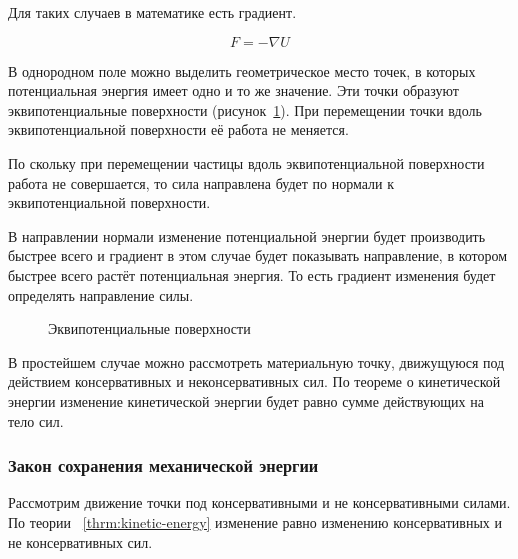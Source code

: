 Для таких случаев в математике есть градиент.

\begin{equation}
  F = - \nabla U
\end{equation}

В однородном поле можно выделить геометрическое место точек, в которых
потенциальная энергия имеет одно и то же значение. Эти точки образуют
эквипотенциальные поверхности (рисунок~\ref{fig:equipotential-surface}). При
перемещении точки вдоль эквипотенциальной поверхности её работа не меняется.

По скольку при перемещении частицы вдоль эквипотенциальной поверхности работа
не совершается, то сила направлена будет по нормали к эквипотенциальной
поверхности.

В направлении нормали изменение потенциальной энергии будет производить быстрее
всего и градиент в этом случае будет показывать направление, в котором быстрее
всего растёт потенциальная энергия. То есть градиент изменения будет определять
направление силы.

\begin{figure}[htpb]
  \begin{center}
  \end{center}
  \caption{Эквипотенциальные поверхности}%
  \label{fig:equipotential-surface}
\end{figure}

В простейшем случае можно рассмотреть материальную точку, движущуюся под
действием консервативных и неконсервативных сил. По теореме о кинетической
энергии изменение кинетической энергии будет равно сумме действующих на тело
сил.

\subsubsection{Закон сохранения механической энергии}

Рассмотрим движение точки под консервативными и не консервативными силами. По
теории ~\ref{thrm:kinetic-energy} изменение равно изменению консервативных и
не консервативных сил.


